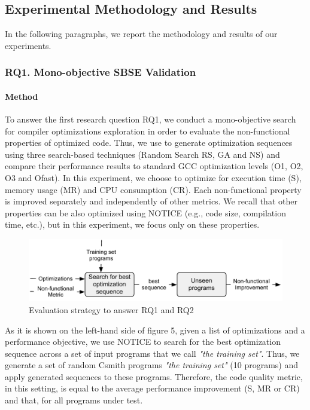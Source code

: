 \subsection{Experimental Methodology and Results}
In the following paragraphs, we report the methodology and results of our experiments.

\subsubsection{RQ1. Mono-objective SBSE Validation}
\paragraph{Method}

To answer the first research question RQ1, we conduct a mono-objective search for compiler optimizations exploration in order to evaluate the non-functional properties of optimized code. Thus, we use to generate optimization sequences using three search-based techniques (Random Search RS, GA and NS) and compare their performance results to standard GCC optimization levels (O1, O2, O3 and Ofast). 
In this experiment, we choose to optimize for execution time (S), memory usage (MR) and CPU consumption (CR). Each non-functional property is improved separately and independently of other metrics. We recall that other properties can be also optimized using NOTICE (e.g., code size, compilation time, etc.), but in this experiment, we focus only on these properties.
\vspace{-1em}
\begin{figure}[h]
	\centering
	\includegraphics[width=1.\linewidth]{Ressources/sensitivity.pdf}
	\caption{Evaluation strategy to answer RQ1 and RQ2}
	
\end{figure}

\setlength\abovecaptionskip{0.25ex}
As it is shown on the left-hand side of figure 5, given a list of optimizations and a performance objective, we use NOTICE to search for the best optimization sequence across a set of input programs that we call \textit{"the training set"}. Thus, we generate a set of random Csmith programs \textit{"the training set"} (10 programs) and apply generated sequences to these programs. Therefore, the code quality metric, in this setting, is equal to the average performance improvement (S, MR or CR) and that, for all programs under test. 

